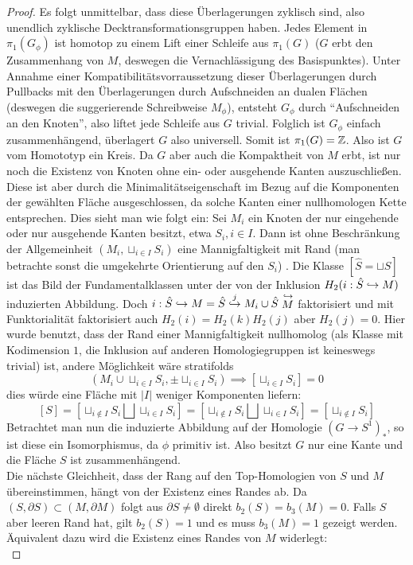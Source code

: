 \begin{proof}
	 Es folgt unmittelbar, dass diese Überlagerungen zyklisch sind, also unendlich zyklische Decktransformationsgruppen haben. Jedes Element in $\pi_1(G_\phi)$ ist homotop zu einem Lift einer Schleife  aus $\pi_1(G)$ ($G$ erbt den Zusammenhang von $M$, deswegen die Vernachlässigung des Basispunktes). Unter Annahme einer Kompatibilitätsvorraussetzung dieser Überlagerungen durch Pullbacks mit den Überlagerungen durch Aufschneiden an dualen Flächen (deswegen die suggerierende Schreibweise $M_\phi$), entsteht $G_\phi$ durch "`Aufschneiden an den Knoten"', also liftet jede Schleife aus $G$ trivial. Folglich ist $G_\phi$ einfach zusammenhängend, überlagert $G$ also universell. Somit ist $\pi_1(G)= \mathbb{Z}$. Also ist $G$ vom Homototyp ein Kreis. Da $G$ aber auch die Kompaktheit von $M$ erbt, ist nur noch die Existenz von Knoten ohne ein- oder ausgehende Kanten auszuschließen. Diese ist aber durch die Minimalitätseigenschaft im Bezug auf die Komponenten der gewählten Fläche ausgeschlossen, da solche Kanten einer nullhomologen Kette entsprechen. Dies sieht man wie folgt ein: Sei $M_i$ ein Knoten der nur eingehende oder nur ausgehende Kanten besitzt, etwa $S_i, i \in I$. Dann ist ohne Beschränkung der Allgemeinheit $(M_i,\sqcup_{i\in I}S_i)$ eine Mannigfaltigkeit mit Rand (man betrachte sonst die umgekehrte Orientierung auf den $S_i$) . Die Klasse $[\hat S = \sqcup S]$ ist das Bild der Fundamentalklassen unter der von der Inklusion $H_2(i:\hat S \hookrightarrow M)$ induzierten Abbildung. Doch $i: \hat S \hookrightarrow M = \hat S \stackrel j {\hookrightarrow} M_i \cup \hat S \stackrel{\hookrightarrow} M$ faktorisiert und mit Funktorialität faktorisiert auch $H_2(i)=H_2(k)H_2(j)$ aber $H_2(j)=0$. Hier wurde benutzt, dass der Rand einer Mannigfaltigkeit nullhomolog (als Klasse mit Kodimension $1$, die Inklusion auf anderen Homologiegruppen ist keineswegs trivial) ist,
	 andere Möglichkeit wäre stratifolds
	 \[
	 	(M_i\cup \sqcup_{i\in I} S_i, \pm \sqcup_{i\in I} S_i) \implies [\sqcup_{i\in I}S_i]=0
	 \]
	 dies würde eine Fläche mit $|I|$ weniger Komponenten liefern:
	 \[
	 	[S]=[\sqcup_{i\not \in I} S_i\bigsqcup \sqcup_{i\in I} S_i] = [\sqcup_{i\not \in I} S_i \bigsqcup \sqcup_{i\in I} S_i] = [\sqcup_{i\not \in I}S_i]
	 \]
	 Betrachtet man nun die induzierte Abbildung auf der Homologie $(G\to S^1)_*$, so ist diese ein Isomorphismus, da $\phi$ primitiv ist. Also besitzt $G$ nur eine Kante und die Fläche $S$ ist zusammenhängend.\\
	 Die nächste Gleichheit, dass der Rang auf den Top-Homologien von $S$ und $M$ übereinstimmen, hängt von der Existenz eines Randes ab. Da $(S,\partial S) \subset (M,\partial M)$ folgt aus $\partial S \neq \emptyset$ direkt $b_2(S)=b_3(M)=0$. Falls $S$ aber leeren Rand hat, gilt $b_2(S)=1$ und es muss $b_3(M)=1$ gezeigt werden. Äquivalent dazu wird die Existenz eines Randes von $M$ widerlegt:\\

\end{proof}
